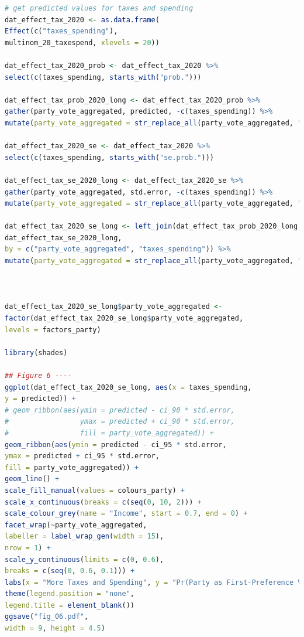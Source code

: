 \documentclass[12pt,letterpaper]{article}
\begin{document}
\begin{lstlisting}[language=R]
# get predicted values for taxes and spending
dat_effect_tax_2020 <- as.data.frame(
Effect(c("taxes_spending"), 
multinom_20_taxespend, xlevels = 20))

dat_effect_tax_2020_prob <- dat_effect_tax_2020 %>% 
select(c(taxes_spending, starts_with("prob.")))

dat_effect_tax_prob_2020_long <- dat_effect_tax_2020_prob %>% 
gather(party_vote_aggregated, predicted, -c(taxes_spending)) %>% 
mutate(party_vote_aggregated = str_replace_all(party_vote_aggregated, "prob.", ""))

dat_effect_tax_2020_se <- dat_effect_tax_2020 %>% 
select(c(taxes_spending, starts_with("se.prob.")))

dat_effect_tax_se_2020_long <- dat_effect_tax_2020_se %>% 
gather(party_vote_aggregated, std.error, -c(taxes_spending)) %>% 
mutate(party_vote_aggregated = str_replace_all(party_vote_aggregated, "se.prob.", ""))

dat_effect_tax_2020_se_long <- left_join(dat_effect_tax_prob_2020_long,
dat_effect_tax_se_2020_long,
by = c("party_vote_aggregated", "taxes_spending")) %>% 
mutate(party_vote_aggregated = str_replace_all(party_vote_aggregated, "\\.", " ")) 



dat_effect_tax_2020_se_long$party_vote_aggregated <- 
factor(dat_effect_tax_2020_se_long$party_vote_aggregated,
levels = factors_party)

library(shades)

## Figure 6 ----
ggplot(dat_effect_tax_2020_se_long, aes(x = taxes_spending, 
y = predicted)) +
# geom_ribbon(aes(ymin = predicted - ci_90 * std.error,
#                 ymax = predicted + ci_90 * std.error,
#                 fill = party_vote_aggregated)) +
geom_ribbon(aes(ymin = predicted - ci_95 * std.error,
ymax = predicted + ci_95 * std.error,
fill = party_vote_aggregated)) +
geom_line() +
scale_fill_manual(values = colours_party) +
scale_x_continuous(breaks = c(seq(0, 10, 2))) +
scale_colour_grey(name = "Income", start = 0.7, end = 0) +
facet_wrap(~party_vote_aggregated,
labeller = label_wrap_gen(width = 15),
nrow = 1) +
scale_y_continuous(limits = c(0, 0.6),
breaks = c(seq(0, 0.6, 0.1))) +
labs(x = "More Taxes and Spending", y = "Pr(Party as First-Preference Vote Choice)") +
theme(legend.position = "none", 
legend.title = element_blank())
ggsave("fig_06.pdf",
width = 9, height = 4.5)

\end{lstlisting}
\end{document}
